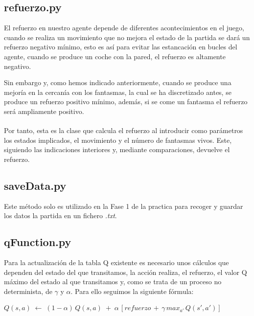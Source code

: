 \documentclass[11pt,a4paper]{article}
\begin{document}
\subsection{refuerzo.py}

El refuerzo en nuestro agente depende de diferentes acontecimientos en el juego, cuando se realiza un movimiento que no mejora el estado de la partida se dará un refuerzo negativo mínimo, esto es así para evitar las estancación en bucles del agente, cuando se produce un coche con la pared, el refuerzo es altamente negativo. 

Sin embargo y, como hemos indicado anteriormente, cuando se produce una mejoría en la cercanía con los fantasmas, la cual se ha discretizado antes, se produce un refuerzo positivo mínimo, además, si se come un fantasma el refuerzo será ampliamente positivo.

\paragraph{}

Por tanto, esta es la clase que calcula el refuerzo al introducir como parámetros los estados implicados, el movimiento y el número de fantasmas vivos. Este, siguiendo las indicaciones interiores y, mediante comparaciones, devuelve el refuerzo.

\subsection{saveData.py}

Este método solo es utilizado en la Fase 1 de la practica para recoger y guardar los datos la partida en un fichero \textit{.txt}.

\subsection{qFunction.py}

Para la actualización de la tabla Q existente es necesario unos cálculos que dependen del estado del que transitamos, la acción realiza, el refuerzo, el valor Q máximo del estado al que transitamos y, como se trata de un proceso no determinista, de $\gamma$ y $\alpha$. Para ello seguimos la siguiente fórmula:

\begin{center}
$Q(s,a) \; \leftarrow \; (1 - \alpha) \, Q(s,a) \; + \; \alpha \, [ refuerzo \, + \, \gamma \, max_{a'} \, Q(s',a')]$
\end{center}
\end{document}
